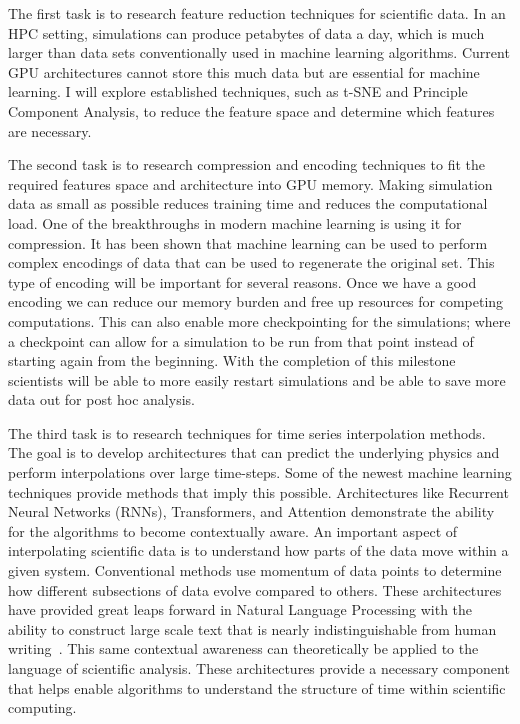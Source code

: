 \documentclass[12pt]{article}
\begin{document}
 The first task is to research feature reduction techniques for
scientific data. In an HPC setting, simulations can produce petabytes of data a
day, which is much larger than data sets conventionally used in machine learning
algorithms. Current GPU architectures cannot store this much data but are
essential for machine learning. I will explore established techniques, such as
t-SNE and Principle Component Analysis, to reduce the feature space and
determine which features are necessary.

 The second task is to research compression and encoding techniques to
fit the required features space and architecture into GPU memory. Making
simulation data as small as possible reduces training time and reduces the
computational load. One of the breakthroughs in modern machine learning is using
it for compression. It has been shown that machine learning can be used to
perform complex encodings of data that can be used to regenerate the original
set. This type of encoding will be important for several reasons. Once we have a
good encoding we can reduce our memory burden and free up resources for
competing computations. This can also enable more checkpointing for the
simulations; where a checkpoint can allow for a simulation to be run from that
point instead of starting again from the beginning. With the completion of this
milestone scientists will be able to more easily restart simulations and be able
to save more data out for post hoc analysis.

 The third task is to research techniques for time series interpolation
methods. The goal is to develop architectures that can predict 
the underlying physics and perform interpolations over large time-steps. Some
of the newest machine learning techniques provide methods that imply this
possible. Architectures like Recurrent Neural Networks (RNNs), Transformers, and
Attention demonstrate the ability for the algorithms to become contextually
aware. An important aspect of interpolating scientific data is to understand how
parts of the data move within a given system. Conventional methods use momentum
of data points to determine how different subsections of data evolve compared to
others. These architectures have provided great leaps forward in Natural
Language Processing with the ability to construct large scale text that is
nearly indistinguishable from human writing~\cite{radford2019language}. This
same contextual awareness can theoretically be applied to the language of
scientific analysis. These architectures provide a necessary component that
helps enable algorithms to understand the structure of time within scientific
computing. 
\end{document}
